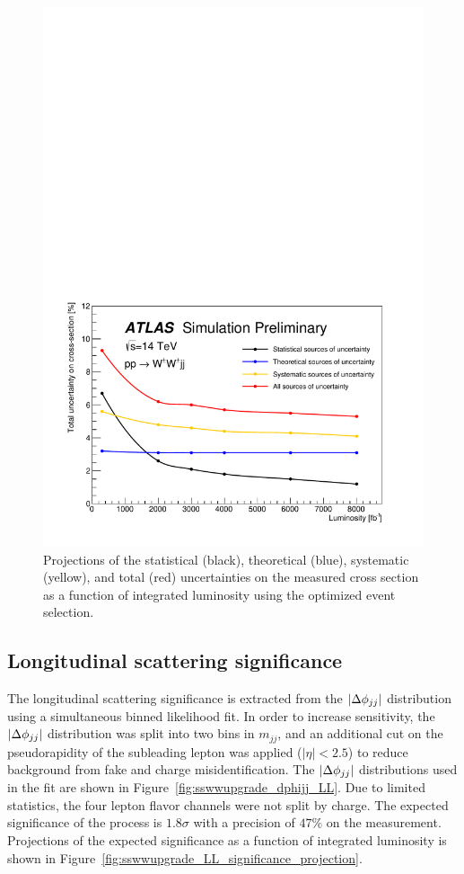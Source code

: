 \begin{figure}[htbp]
  \centering
  \includegraphics[width=.8\textwidth]{figs/ssww_upgrade/results/uncertainty_projection}
  \caption{Projections of the statistical (black), theoretical (blue), systematic (yellow), and total (red) uncertainties on the measured cross section as a function of integrated luminosity using the optimized event selection.}
  \label{fig:sswwupgrade_uncertainty_projection}
\end{figure}

\subsection{Longitudinal scattering significance}\label{sswwupgrade:results_longitudinal_sig}
The longitudinal scattering significance is extracted from the $|\Delta\phi_{jj}|$ distribution using a simultaneous binned likelihood fit.
In order to increase sensitivity, the $|\Delta\phi_{jj}|$ distribution was split into two bins in $m_{jj}$, and an additional cut on the pseudorapidity of the subleading lepton was applied ($|\eta| < 2.5$) to reduce background from fake and charge misidentification.
The $|\Delta\phi_{jj}|$ distributions used in the fit are shown in Figure~\ref{fig:sswwupgrade_dphijj_LL}.
Due to limited statistics, the four lepton flavor channels were not split by charge.
The expected significance of the \sswwll process is $1.8\sigma$ with a precision of $47\%$ on the measurement.
Projections of the expected significance as a function of integrated luminosity is shown in Figure~\ref{fig:sswwupgrade_LL_significance_projection}.


